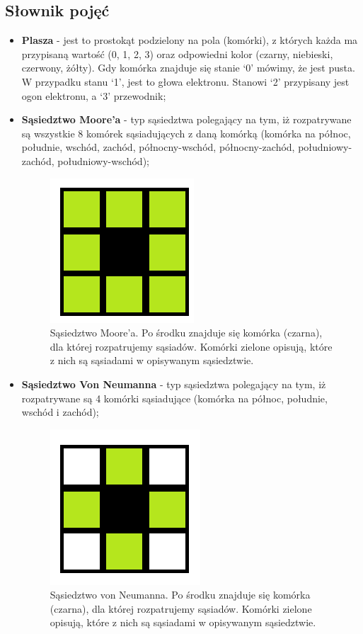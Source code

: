 \documentclass[a4paper,12pt]{article}
\begin{document}
\subsection{Słownik pojęć}
\begin{itemize}
\item \textbf{Plasza} - jest to prostokąt podzielony na pola (komórki), z których każda ma przypisaną wartość (0, 1, 2, 3) oraz odpowiedni kolor (czarny, niebieski, czerwony, żółty). Gdy komórka znajduje się stanie `0' mówimy, że jest pusta. W przypadku stanu `1', jest to głowa elektronu. Stanowi `2' przypisany jest ogon elektronu, a `3' przewodnik;
\item \textbf{Sąsiedztwo Moore'a} - typ sąsiedztwa polegający na tym, iż rozpatrywane są wszystkie 8 komórek sąsiadujących z daną komórką (komórka na północ, południe, wschód, zachód, północny-wschód, północny-zachód, południowy-zachód, południowy-wschód);
\begin{figure}[H]
	\centering
	\includegraphics[scale=1]{moore.png}
	\caption{Sąsiedztwo Moore'a. Po środku znajduje się komórka (czarna), dla której rozpatrujemy sąsiadów. Komórki zielone opisują, które z nich są sąsiadami w opisywanym sąsiedztwie.}
\end{figure}
\item \textbf{Sąsiedztwo Von Neumanna} - typ sąsiedztwa polegający na tym, iż rozpatrywane są 4 komórki sąsiadujące (komórka na północ, południe, wschód i zachód);
\begin{figure}[H]
	\centering
	\includegraphics[scale=1]{von_neumann.png}
	\caption{Sąsiedztwo von Neumanna. Po środku znajduje się komórka (czarna), dla której rozpatrujemy sąsiadów. Komórki zielone opisują, które z nich są sąsiadami w opisywanym sąsiedztwie.}
\end{figure}
\end{itemize}
\end{document}
